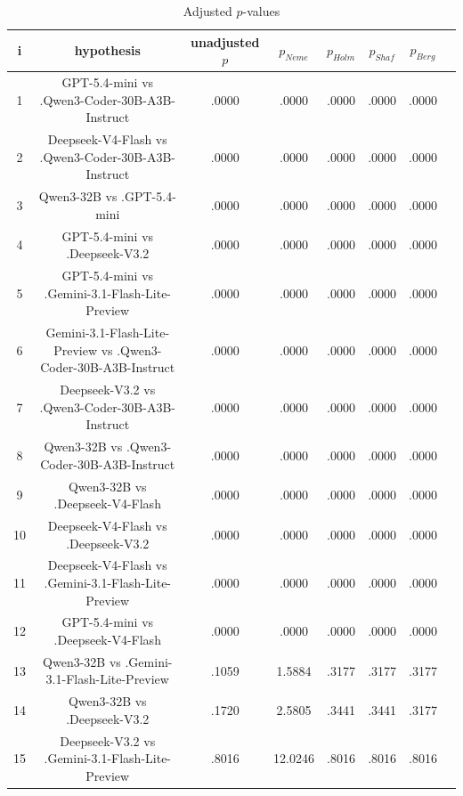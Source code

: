 \documentclass[a4paper,10pt]{article}
\begin{document}
\begin{landscape}
\begin{table}[!htp]
\centering\tiny
\caption{Adjusted $p$-values}
\begin{tabular}{cccccccc}
i&hypothesis&unadjusted $p$&$p_{Neme}$&$p_{Holm}$&$p_{Shaf}$&$p_{Berg}$\\
\hline
1&GPT-5.4-mini vs .Qwen3-Coder-30B-A3B-Instruct&.0000&.0000&.0000&.0000&.0000\\2&Deepseek-V4-Flash vs .Qwen3-Coder-30B-A3B-Instruct&.0000&.0000&.0000&.0000&.0000\\3&Qwen3-32B vs .GPT-5.4-mini&.0000&.0000&.0000&.0000&.0000\\4&GPT-5.4-mini vs .Deepseek-V3.2&.0000&.0000&.0000&.0000&.0000\\5&GPT-5.4-mini vs .Gemini-3.1-Flash-Lite-Preview&.0000&.0000&.0000&.0000&.0000\\6&Gemini-3.1-Flash-Lite-Preview vs .Qwen3-Coder-30B-A3B-Instruct&.0000&.0000&.0000&.0000&.0000\\7&Deepseek-V3.2 vs .Qwen3-Coder-30B-A3B-Instruct&.0000&.0000&.0000&.0000&.0000\\8&Qwen3-32B vs .Qwen3-Coder-30B-A3B-Instruct&.0000&.0000&.0000&.0000&.0000\\9&Qwen3-32B vs .Deepseek-V4-Flash&.0000&.0000&.0000&.0000&.0000\\10&Deepseek-V4-Flash vs .Deepseek-V3.2&.0000&.0000&.0000&.0000&.0000\\11&Deepseek-V4-Flash vs .Gemini-3.1-Flash-Lite-Preview&.0000&.0000&.0000&.0000&.0000\\12&GPT-5.4-mini vs .Deepseek-V4-Flash&.0000&.0000&.0000&.0000&.0000\\13&Qwen3-32B vs .Gemini-3.1-Flash-Lite-Preview&.1059&1.5884&.3177&.3177&.3177\\14&Qwen3-32B vs .Deepseek-V3.2&.1720&2.5805&.3441&.3441&.3177\\15&Deepseek-V3.2 vs .Gemini-3.1-Flash-Lite-Preview&.8016&12.0246&.8016&.8016&.8016\\\hline
\end{tabular}
\end{table}

\end{landscape}
\end{document}
